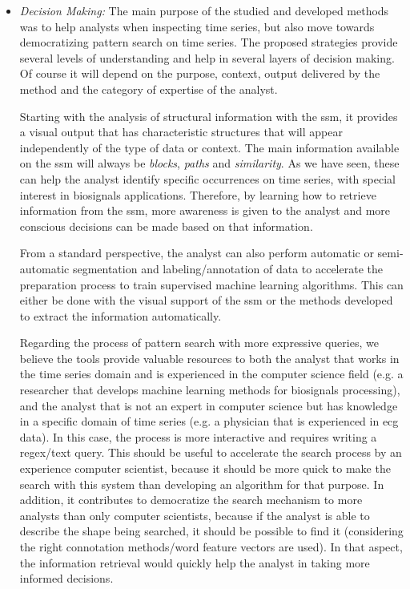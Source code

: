 \begin{itemize}
\item \textit{Decision Making:} The main purpose of the studied and developed methods was to help analysts when inspecting time series, but also move towards democratizing pattern search on time series. The proposed strategies provide several levels of understanding and help in several layers of decision making. Of course it will depend on the purpose, context, output delivered by the method and the category of expertise of the analyst.
\par
Starting with the analysis of structural information with the \gls{ssm}, it provides a visual output that has characteristic structures that will appear independently of the type of data or context. The main information available on the \gls{ssm} will always be \textit{blocks}, \textit{paths} and \textit{similarity}. As we have seen, these can help the analyst identify specific occurrences on time series, with special interest in biosignals applications. Therefore, by learning how to retrieve information from the \gls{ssm}, more awareness is given to the analyst and more conscious decisions can be made based on that information.
\par
From a standard perspective, the analyst can also perform automatic or semi-automatic segmentation and labeling/annotation of data to accelerate the preparation process to train supervised machine learning algorithms. This can either be done with the visual support of the \gls{ssm} or the methods developed to extract the information automatically.
\par
Regarding the process of pattern search with more expressive queries, we believe the tools provide valuable resources to both the analyst that works in the time series domain and is experienced in the computer science field (e.g. a researcher that develops machine learning methods for biosignals processing), and the analyst that is not an expert in computer science but has knowledge in a specific domain of time series (e.g. a physician that is experienced in \gls{ecg} data). In this case, the process is more interactive and requires writing a \gls{regex}/text query. This should be useful to accelerate the search process by an experience computer scientist, because it should be more quick to make the search with this system than developing an algorithm for that purpose. In addition, it contributes to democratize the search mechanism to more analysts than only computer scientists, because if the analyst is able to describe the shape being searched, it should be possible to find it (considering the right connotation methods/word feature vectors are used). In that aspect, the information retrieval would quickly help the analyst in taking more informed decisions.
\end{itemize}


